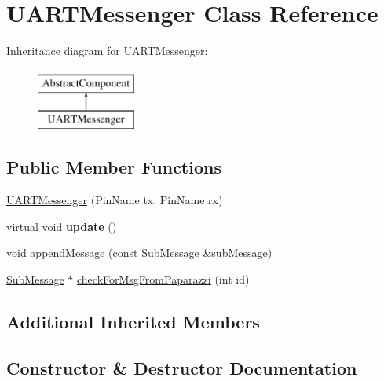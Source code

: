 \hypertarget{class_u_a_r_t_messenger}{}\section{U\+A\+R\+T\+Messenger Class Reference}
\label{class_u_a_r_t_messenger}
Inheritance diagram for U\+A\+R\+T\+Messenger\+:\begin{figure}[H]
\begin{center}
\leavevmode
\includegraphics[height=2.000000cm]{class_u_a_r_t_messenger}
\end{center}
\end{figure}
\subsection*{Public Member Functions}
\begin{DoxyCompactItemize}
\item 
\hyperlink{class_u_a_r_t_messenger_a2fcc2d4308e961996cf3dd120f297112}{U\+A\+R\+T\+Messenger} (Pin\+Name tx, Pin\+Name rx)
\item 
\mbox{\label{class_u_a_r_t_messenger_a7f2c3bdcf3a2b082e52815b97be37281}} 
virtual void {\bfseries update} ()
\item 
void \hyperlink{class_u_a_r_t_messenger_ada0967869e320c236a211b405abf128a}{append\+Message} (const \hyperlink{struct_sub_message}{Sub\+Message} \&sub\+Message)
\item 
\hyperlink{struct_sub_message}{Sub\+Message} $\ast$ \hyperlink{class_u_a_r_t_messenger_affb33ad31e70001505e14d02e1f8a018}{check\+For\+Msg\+From\+Paparazzi} (int id)
\end{DoxyCompactItemize}
\subsection*{Additional Inherited Members}


\subsection{Constructor \& Destructor Documentation}
\mbox{\label{class_u_a_r_t_messenger_a2fcc2d4308e961996cf3dd120f297112}} 
